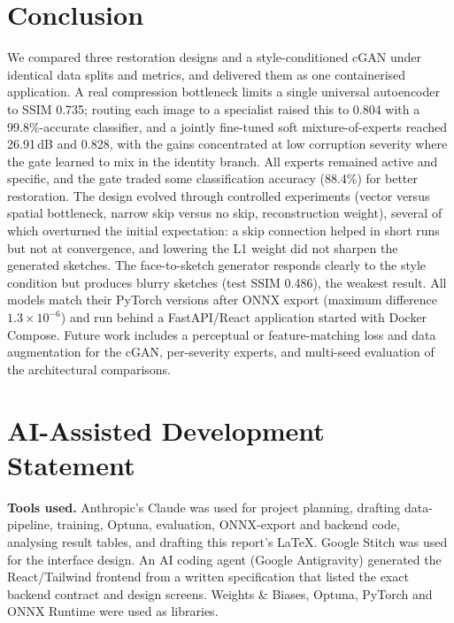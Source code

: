 \documentclass[conference]{IEEEtran}
\begin{document}
\section{Conclusion}
We compared three restoration designs and a style-conditioned cGAN under identical data splits and metrics, and delivered them as one containerised application. A real compression bottleneck limits a single universal autoencoder to SSIM 0.735; routing each image to a specialist raised this to 0.804 with a 99.8\%-accurate classifier, and a jointly fine-tuned soft mixture-of-experts reached 26.91\,dB and 0.828, with the gains concentrated at low corruption severity where the gate learned to mix in the identity branch. All experts remained active and specific, and the gate traded some classification accuracy (88.4\%) for better restoration. The design evolved through controlled experiments (vector versus spatial bottleneck, narrow skip versus no skip, reconstruction weight), several of which overturned the initial expectation: a skip connection helped in short runs but not at convergence, and lowering the L1 weight did not sharpen the generated sketches. The face-to-sketch generator responds clearly to the style condition but produces blurry sketches (test SSIM 0.486), the weakest result. All models match their PyTorch versions after ONNX export (maximum difference $1.3\times10^{-6}$) and run behind a FastAPI/React application started with Docker Compose. Future work includes a perceptual or feature-matching loss and data augmentation for the cGAN, per-severity experts, and multi-seed evaluation of the architectural comparisons.

\appendices
\section{AI-Assisted Development Statement}
\textbf{Tools used.} Anthropic's Claude was used for project planning, drafting data-pipeline, training, Optuna, evaluation, ONNX-export and backend code, analysing result tables, and drafting this report's LaTeX. Google Stitch was used for the interface design. An AI coding agent (Google Antigravity) generated the React/Tailwind frontend from a written specification that listed the exact backend contract and design screens. Weights \& Biases, Optuna, PyTorch and ONNX Runtime were used as libraries.
\end{document}
